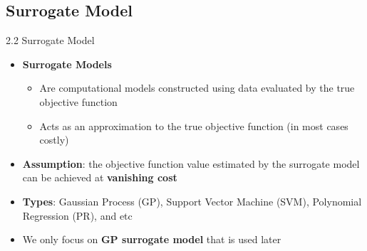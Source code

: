 \documentclass{beamer}
\begin{document}
\subsection{Surrogate Model}
\begin{frame}{2.2 Surrogate Model}

\begin{itemize}
    \item \textbf{Surrogate Models} 
    \begin{itemize}
        \item Are computational models constructed using data evaluated by the true objective function
        \item Acts as an approximation to the true objective function (in most cases costly)
    \end{itemize}
    \item \textbf{Assumption}: the objective function value estimated by the surrogate model can be achieved at \textbf{vanishing cost}
    \item \textbf{Types}: Gaussian Process (GP), Support Vector Machine (SVM),  Polynomial Regression (PR), and etc
    \item We only focus on \textbf{GP surrogate model} that is used later
  
    
\end{itemize}
\end{frame}
\end{document}
